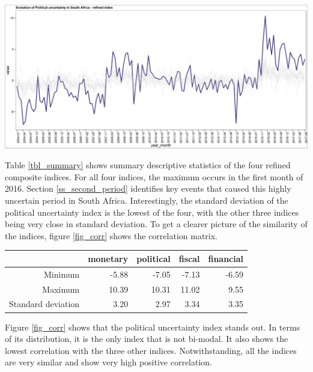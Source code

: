 \documentclass[11pt,preprint, authoryear]{elsarticle}
\let\origfigure\figure
\let\endorigfigure\endfigure
\renewenvironment{figure}[1][2] {
    \expandafter\origfigure\expandafter[H]
} {
    \endorigfigure
}
\let\origtable\table
\let\endorigtable\endtable
\renewenvironment{table}[1][2] {
    \expandafter\origtable\expandafter[H]
} {
    \endorigtable
}
\numberwithin{equation}{section}
\numberwithin{figure}{section}
\numberwithin{table}{section}
\begin{document}
\begin{figure}
	\centering
	\includegraphics[width=\linewidth, keepaspectratio]{bin/pol_comp_refine}\\
	\caption{Composite Political uncertainty refined index. \label{fig_pol_comp_r}}
\end{figure}

Table \ref{tbl_summary} shows summary descriptive statistics of the four refined composite indices. For all four indices, the maximum occurs in the first month of 2016. Section \ref{ss_second_period} identifies key events that caused this highly uncertain period in South Africa. Interestingly, the standard deviation of the political uncertainty index is the lowest of the four, with the other three indices being very close in standard deviation. To get a clearer picture of the similarity of the indices, figure \ref{fig_corr} shows the correlation matrix.  

\begin{table}[ht]\footnotesize
	\caption{Summary table per refined composite index \label{tbl_summary}} 
	\centering
	\begin{tabular}{rrrrr}
		\hline
		& monetary & political & fiscal & financial \\ 
		\hline
		Minimum & -5.88 & -7.05 & -7.13 & -6.59 \\ 
		Maximum & 10.39 & 10.31 & 11.02 & 9.55 \\ 
		Standard deviation & 3.20 & 2.97 & 3.34 & 3.35 \\ 
		\hline
	\end{tabular}
\end{table}

Figure \ref{fig_corr} shows that the political uncertainty index stands out. In terms of its distribution, it is the only index that is not bi-modal. It also shows the lowest correlation with the three other indices. Notwithstanding, all the indices are very similar and show very high positive correlation.
\end{document}
